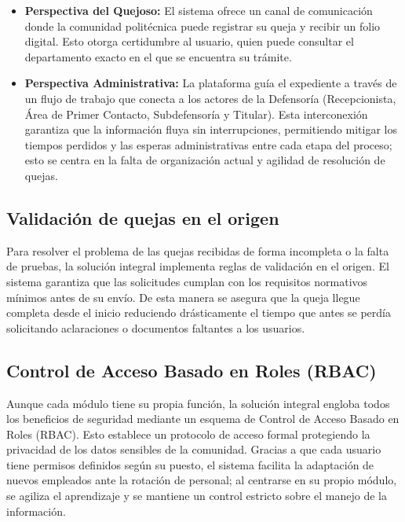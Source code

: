\begin{flushleft}
\begin{itemize}
    \item \textbf{Perspectiva del Quejoso:} El sistema ofrece un canal de comunicación donde la comunidad politécnica puede registrar su queja y recibir un folio digital. Esto otorga certidumbre al usuario, quien puede consultar el departamento exacto en el que se encuentra su trámite.
    \item \textbf{Perspectiva Administrativa:} La plataforma guía el expediente a través de un flujo de trabajo que conecta a los actores de la Defensoría (Recepcionista, Área de Primer Contacto, Subdefensoría y Titular). Esta interconexión garantiza que la información fluya sin interrupciones, permitiendo mitigar los tiempos perdidos y las esperas administrativas entre cada etapa del proceso; esto se centra en la falta de organización actual y agilidad de resolución de quejas.
\end{itemize}

\subsection{Validación de quejas en el origen}

Para resolver el problema de las quejas recibidas de forma incompleta o la falta de pruebas, la solución integral implementa reglas de validación en el origen. El sistema garantiza que las solicitudes cumplan con los requisitos normativos mínimos antes de su envío. De esta manera se asegura que la queja llegue completa desde el inicio reduciendo drásticamente el tiempo que antes se perdía solicitando aclaraciones o documentos faltantes a los usuarios.

\subsection{Control de Acceso Basado en Roles (RBAC)}

Aunque cada módulo tiene su propia función, la solución integral engloba todos los beneficios de seguridad mediante un esquema de Control de Acceso Basado en Roles (RBAC). Esto establece un protocolo de acceso formal protegiendo la privacidad de los datos sensibles de la comunidad. Gracias a que cada usuario tiene permisos definidos según su puesto, el sistema facilita la adaptación de nuevos empleados ante la rotación de personal; al centrarse en su propio módulo, se agiliza el aprendizaje y se mantiene un control estricto sobre el manejo de la información.


\end{flushleft}
